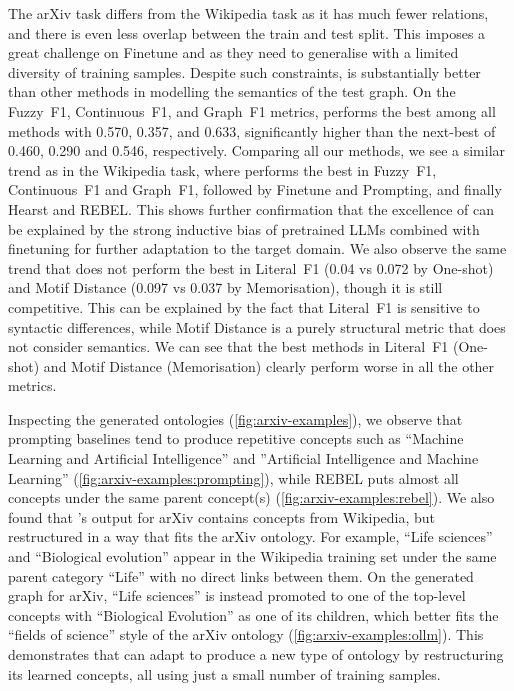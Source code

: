 The arXiv task differs from the Wikipedia task as it has much fewer relations, and there is even less overlap between the train and test split. This imposes a great challenge on Finetune and \name as they need to generalise with a limited diversity of training samples. Despite such constraints, \name is substantially better than other methods in modelling the semantics of the test graph.
On the Fuzzy~F1, Continuous~F1, and Graph~F1 metrics, \name performs the best among all methods with 0.570, 0.357, and 0.633, significantly higher than the next-best of 0.460, 0.290 and 0.546, respectively. Comparing all our methods, we see a similar trend as in the Wikipedia task, where \name performs the best in Fuzzy~F1, Continuous~F1 and Graph~F1, followed by Finetune and Prompting, and finally Hearst and REBEL. This shows further confirmation that the excellence of \name can be explained by the strong inductive bias of pretrained LLMs combined with finetuning for further adaptation to the target domain. We also observe the same trend that \name does not perform the best in Literal~F1 (0.04 vs 0.072 by One-shot) and Motif Distance (0.097 vs 0.037 by Memorisation), though it is still competitive. This can be explained by the fact that Literal~F1 is sensitive to syntactic differences, while Motif Distance is a purely structural metric that does not consider semantics. We can see that the best methods in Literal~F1 (One-shot) and Motif Distance (Memorisation) clearly perform worse in all the other metrics.



Inspecting the generated ontologies (\cref{fig:arxiv-examples}), we observe that prompting baselines tend to produce repetitive concepts such as ``Machine Learning and Artificial Intelligence'' and ''Artificial Intelligence and Machine Learning'' (\cref{fig:arxiv-examples:prompting}), while REBEL puts almost all concepts under the same parent concept(s) (\cref{fig:arxiv-examples:rebel}).
We also found that \name's output for arXiv contains concepts from Wikipedia, but restructured in a way that fits the arXiv ontology. For example, ``Life sciences'' and ``Biological evolution'' appear in the Wikipedia training set under the same parent category ``Life'' with no direct links between them. On the generated graph for arXiv, ``Life sciences'' is instead promoted to one of the top-level concepts with ``Biological Evolution'' as one of its children, which better fits the ``fields of science'' style of the arXiv ontology (\cref{fig:arxiv-examples:ollm}). This demonstrates that \name can adapt to produce a new type of ontology by restructuring its learned concepts, all using just a small number of training samples.

